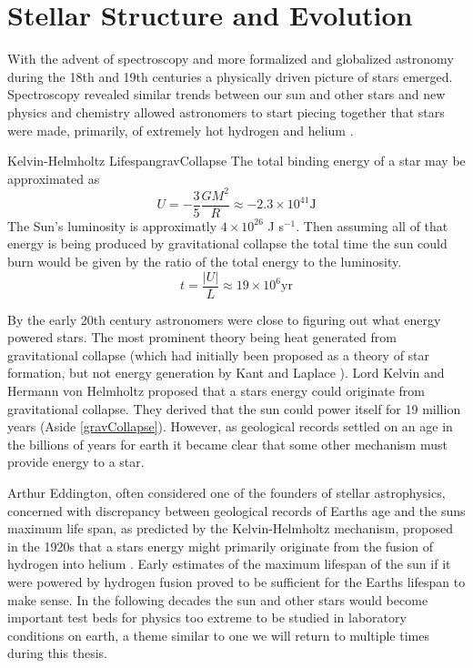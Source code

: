 \chapter{Stellar Structure and Evolution}
With the advent of spectroscopy and more formalized and globalized astronomy
during the 18th and 19th centuries a physically driven picture of stars emerged.
Spectroscopy revealed similar trends between our sun and other stars and new
physics and chemistry allowed astronomers to start piecing together that stars
were made, primarily, of extremely hot hydrogen and helium \addcite.

\begin{sidebar}{Kelvin-Helmholtz Lifespan}{gravCollapse}
  The total binding energy of a star may be approximated as
  \begin{equation*}
    U = -\frac{3}{5}\frac{GM^{2}}{R} \approx -2.3 \times 10^{41} \text{J}
  \end{equation*}
  The Sun's luminosity is approximatly $4\times 10^{26}$ J s$^{-1}$. Then
  assuming all of that energy is being produced by gravitational collapse the
  total time the sun could burn would be given by the ratio of the total energy
  to the luminosity.
  \begin{equation*}
    t = \frac{|U|}{L} \approx 19 \times 10^{6} \text{yr}
  \end{equation*}
\end{sidebar}

By the early 20th century astronomers were close to figuring out what energy
powered stars. The most prominent theory being heat generated from
gravitational collapse (which had initially been proposed as a theory of star
formation, but not energy generation by Kant and Laplace \addcite). Lord Kelvin
and Hermann von Helmholtz proposed that a stars energy could originate from
gravitational collapse. They derived that the sun could power itself for 19
million years \addcite (Aside \ref{gravCollapse}). However, as
geological records settled on an age in the billions of years for earth it
became clear that some other mechanism must provide energy to a star.

Arthur Eddington, often considered one of the founders of stellar astrophysics,
concerned with discrepancy between geological records of Earths age and the
suns maximum life span, as predicted by the Kelvin-Helmholtz mechanism,
proposed in the 1920s that a stars energy might primarily originate from the
fusion of hydrogen into helium \addcite. Early estimates of the maximum
lifespan of the sun if it were powered by hydrogen fusion proved to be
sufficient for the Earths lifespan to make sense. In the following decades the
sun and other stars would become important test beds for physics too extreme to
be studied in laboratory conditions on earth, a theme similar to one we will
return to multiple times during this thesis.

